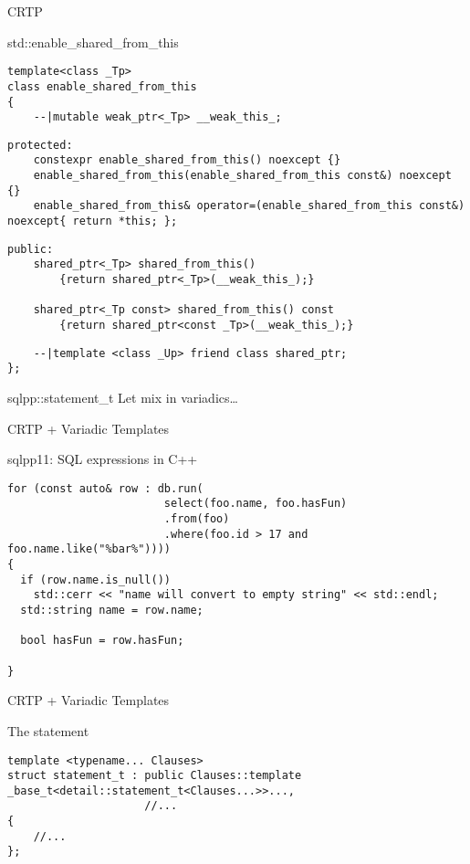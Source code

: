 \documentclass[aspectratio=169,xcolor=dvipsnames]{beamer}
\begin{document}
\begin{frame}[fragile]{CRTP}
    \begin{block}{std::enable\_shared\_from\_this}
        \begin{lstlisting}
template<class _Tp>
class enable_shared_from_this
{
    --|mutable weak_ptr<_Tp> __weak_this_;
        \end{lstlisting}
\pause
        \begin{lstlisting}
protected:
    constexpr enable_shared_from_this() noexcept {}
    enable_shared_from_this(enable_shared_from_this const&) noexcept {}
    enable_shared_from_this& operator=(enable_shared_from_this const&) noexcept{ return *this; };
        \end{lstlisting}
\pause
        \begin{lstlisting}
public:
    shared_ptr<_Tp> shared_from_this()
        {return shared_ptr<_Tp>(__weak_this_);}

    shared_ptr<_Tp const> shared_from_this() const
        {return shared_ptr<const _Tp>(__weak_this_);}
        \end{lstlisting}
\pause
        \begin{lstlisting}
    --|template <class _Up> friend class shared_ptr;
};
        \end{lstlisting}
    \end{block}
\end{frame}

\begin{frame}[fragile]{sqlpp::statement\_t}
    \huge Let mix in variadics\dots
\end{frame}

\begin{frame}[fragile]{CRTP + Variadic Templates}
    \begin{block}{sqlpp11: SQL expressions in C++}
        \begin{lstlisting}
for (const auto& row : db.run(
                        select(foo.name, foo.hasFun)
                        .from(foo)
                        .where(foo.id > 17 and foo.name.like("%bar%"))))
{
  if (row.name.is_null())
    std::cerr << "name will convert to empty string" << std::endl;
  std::string name = row.name;

  bool hasFun = row.hasFun;

}
        \end{lstlisting}
    \end{block}
\end{frame}

\begin{frame}[fragile]{CRTP + Variadic Templates}
    \begin{block}{The statement}
        \begin{lstlisting}
template <typename... Clauses>
struct statement_t : public Clauses::template _base_t<detail::statement_t<Clauses...>>...,
                     //...
{
    //...
};

        \end{lstlisting}
    \end{block}
\end{frame}
\end{document}

